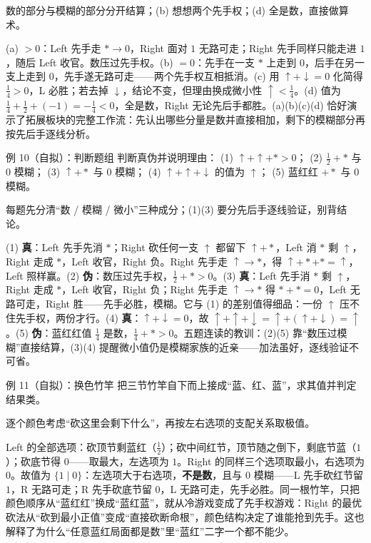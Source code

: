 \hint 数的部分与模糊的部分分开结算；(b) 想想两个先手权；(d) 全是数，直接做算术。

\sol (a) $>0$：Left 先手走 $\ast\to0$，Right 面对 $1$ 无路可走；Right 先手同样只能走进 $1$，随后 Left 收官。数压过先手权。(b) $=0$：先手在一支 $\ast$ 上走到 $0$，后手在另一支上走到 $0$，先手遂无路可走——两个先手权互相抵消。(c) 用 $\uparrow+\downarrow=0$ 化简得 $\tfrac14>0$，L 必胜；若去掉 $\downarrow$，结论不变，但理由换成微小性 $\uparrow<\tfrac14$。(d) 值为 $\tfrac14+\tfrac12+(-1)=-\tfrac14<0$，全是数，Right 无论先后手都胜。(a)(b)(c)(d) 恰好演示了拓展板块的完整工作流：先认出哪些分量是数并直接相加，剩下的模糊部分再按先后手逐线分析。

\begin{problem}{例 10（自拟）：判断题组}
判断真伪并说明理由：
(1) $\uparrow+\uparrow+\ast>0$；
(2) $\tfrac12+\ast$ 与 $0$ 模糊；
(3) $\uparrow+\ast$ 与 $0$ 模糊；
(4) $\uparrow+\uparrow+\downarrow$ 的值为 $\uparrow$；
(5) 蓝红红 $+\ast$ 与 $0$ 模糊。
\end{problem}

\hint 每题先分清“数 / 模糊 / 微小”三种成分；(1)(3) 要分先后手逐线验证，别背结论。

\sol (1) \textbf{真}：Left 先手先消 $\ast$；Right 砍任何一支 $\uparrow$ 都留下 $\uparrow+\ast$，Left 消 $\ast$ 剩 $\uparrow$，Right 走成 $\ast$，Left 收官，Right 负。Right 先手走 $\uparrow\to\ast$，得 $\uparrow+\ast+\ast=\uparrow$，Left 照样赢。(2) \textbf{伪}：数压过先手权，$\tfrac12+\ast>0$。(3) \textbf{真}：Left 先手消 $\ast$ 剩 $\uparrow$，Right 走成 $\ast$，Left 收官，Right 负；Right 先手走 $\uparrow\to\ast$ 得 $\ast+\ast=0$，Left 无路可走，Right 胜——先手必胜，模糊。它与 (1) 的差别值得细品：一份 $\uparrow$ 压不住先手权，两份才行。(4) \textbf{真}：$\uparrow+\downarrow=0$，故 $\uparrow+\uparrow+\downarrow=\uparrow+(\uparrow+\downarrow)=\uparrow$。(5) \textbf{伪}：蓝红红值 $\tfrac14$ 是数，$\tfrac14+\ast>0$。五题连读的教训：(2)(5) 靠“数压过模糊”直接结算，(3)(4) 提醒微小值仍是模糊家族的近亲——加法虽好，逐线验证不可省。

\begin{problem}{例 11（自拟）：换色竹竿}
把三节竹竿自下而上接成“蓝、红、蓝”，求其值并判定结果类。
\end{problem}

\hint 逐个颜色考虑“砍这里会剩下什么”，再按左右选项的支配关系取极值。

\sol Left 的全部选项：砍顶节剩蓝红（$\tfrac12$）；砍中间红节，顶节随之倒下，剩底节蓝（$1$）；砍底节得 $0$——取最大，左选项为 $1$。Right 的同样三个选项取最小，右选项为 $0$。故值为 $\{1\mid 0\}$：左选项大于右选项，\textbf{不是数}，且与 $0$ 模糊——L 先手砍红节留 $1$，R 无路可走；R 先手砍底节留 $0$，L 无路可走，先手必胜。同一根竹竿，只把颜色顺序从“蓝红红”换成“蓝红蓝”，就从冷游戏变成了先手权游戏：Right 的最优砍法从“砍到最小正值”变成“直接砍断命根”，颜色结构决定了谁能抢到先手。这也解释了为什么“任意蓝红局面都是数”里“蓝红”二字一个都不能少。

